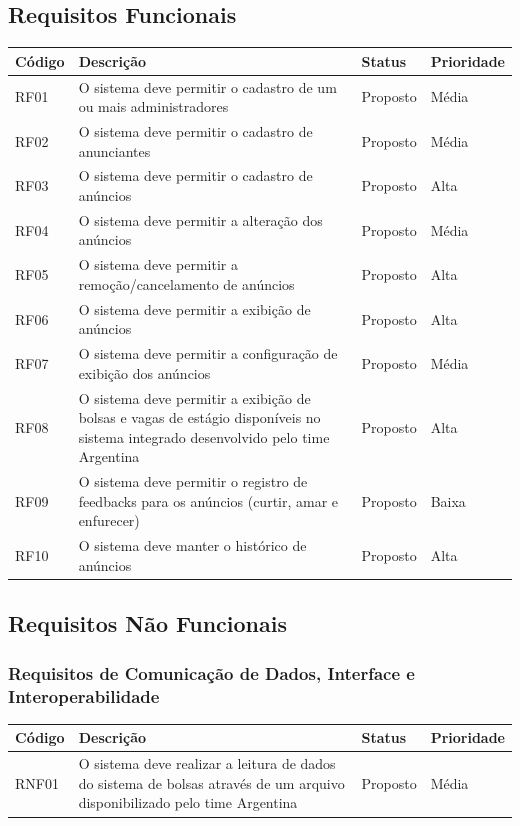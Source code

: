 \documentclass[a4paper, 12pt]{article}
\begin{document}
\subsection{Requisitos Funcionais}
\begin{table}[ht]
	\centering

	\begin{tabular}{p{2cm}p{7cm}p{2cm}p{2cm}}
		\hline
		\cellcolor{gray}Código&\cellcolor{gray}Descrição&\cellcolor{gray}Status&\cellcolor{gray}Prioridade  \\
		\hline
		RF01&O sistema deve permitir o cadastro de um ou mais administradores&Proposto&M\'{e}dia\\
        RF02&O sistema deve permitir o cadastro de anunciantes&Proposto&M\'{e}dia\\
        RF03&O sistema deve permitir o cadastro de an\'{u}ncios&Proposto&Alta\\
        RF04&O sistema deve permitir a altera\c{c}\~{a}o dos an\'{u}ncios&Proposto&M\'{e}dia\\
        RF05&O sistema deve permitir a remo\c{c}\~{a}o/cancelamento de an\'{u}ncios&Proposto&Alta\\
        RF06&O sistema deve permitir a exibi\c{c}\~{a}o de an\'{u}ncios&Proposto&Alta\\
        RF07&O sistema deve permitir a configura\c{c}\~{a}o de exibi\c{c}\~{a}o dos an\'{u}ncios&Proposto&M\'{e}dia\\
        RF08&O sistema deve permitir a exibi\c{c}\~{a}o de bolsas e vagas de est\'{a}gio dispon\'{i}veis no sistema integrado desenvolvido pelo time Argentina&Proposto&Alta\\
        RF09&O sistema deve permitir o registro de feedbacks para os an\'{u}ncios (curtir, amar e enfurecer)&Proposto&Baixa\\
        RF10&O sistema deve manter o hist\'{o}rico de an\'{u}ncios&Proposto&Alta\\
		\hline
	\end{tabular}
\end{table}
\newpage
\subsection{Requisitos Não Funcionais}
\subsubsection{Requisitos de Comunicação de Dados, Interface e Interoperabilidade}
	\begin{table}[ht]
		\rowcolors{1}{}{}
		\centering

		\begin{tabular}{p{2cm}p{7cm}p{2cm}p{2cm}}
			\hline
			\cellcolor{gray}Código&\cellcolor{gray}Descrição&\cellcolor{gray}Status&\cellcolor{gray}Prioridade  \\
			\hline
            RNF01&O sistema deve realizar a leitura de dados do sistema de bolsas atrav\'{e}s de um arquivo disponibilizado pelo time Argentina&Proposto&M\'{e}dia\\
			\hline
		\end{tabular}
	\end{table}%
\end{document}
